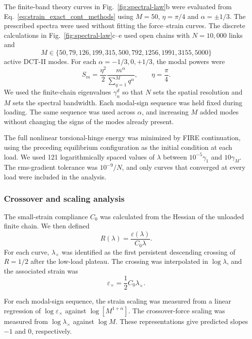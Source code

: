 \documentclass[pdflatex, twocolumn, sn-nature]{sn-jnl}
\begin{document}
The finite-band theory curves in Fig.~\ref{fig:spectral-law}b were evaluated
from Eq.~\eqref{eq:strain_exact_cont_methods} using $M=50$, $\eta=\pi/4$ and
$\alpha=\pm1/3$. The prescribed spectra were used without fitting the force--strain curves.
The discrete calculations in Fig.~\ref{fig:spectral-law}c--e used open chains
with $N=10{,}000$ links and
\begin{equation}
M\in\{50,79,126,199,315,500,792,1256,1991,3155,5000\}
\end{equation}
active DCT-II modes. For each $\alpha=-1/3,0,+1/3$, the modal powers were
\begin{equation}
S_m=
\frac{\eta^2}{2}
\frac{m^\alpha}{\sum_{q=1}^{M}q^\alpha},
\qquad
\eta=\frac{\pi}{4}.
\end{equation}
We used the finite-chain eigenvalues $\gamma_n^d$ so that $N$ sets the spatial resolution and $M$ sets the spectral bandwidth.
Each modal-sign sequence was held fixed during loading. The same sequence was
used across $\alpha$, and increasing $M$ added modes without changing the
signs of the modes already present.

The full nonlinear torsional-hinge energy was minimized by FIRE continuation,
using the preceding equilibrium configuration as the initial condition at
each load. We used 121 logarithmically spaced values of $\lambda$ between
$10^{-5}\gamma_1$ and $10\gamma_M$. The rms-gradient tolerance was
$10^{-9}/N$, and only curves that converged at every load were included in the
analysis.

\subsubsection*{Crossover and scaling analysis}

The small-strain compliance $C_0$ was calculated from the Hessian of the
unloaded finite chain. We then defined
\begin{equation}
R(\lambda)=
\frac{\varepsilon(\lambda)}{C_0\lambda}.
\end{equation}
For each curve, $\lambda_\times$ was identified as the first persistent
descending crossing of $R=1/2$ after the low-load plateau. The crossing was
interpolated in $\log\lambda$, and the associated strain was
\begin{equation}
\varepsilon_\times=
\frac{1}{2}C_0\lambda_\times.
\end{equation}

For each modal-sign sequence, the strain scaling was measured from a linear
regression of $\log\varepsilon_\times$ against
$\log[M^{1+\alpha}]$. The crossover-force scaling was measured from
$\log\lambda_\times$ against $\log M$. These representations give predicted
slopes $-1$ and $0$, respectively.
\end{document}

